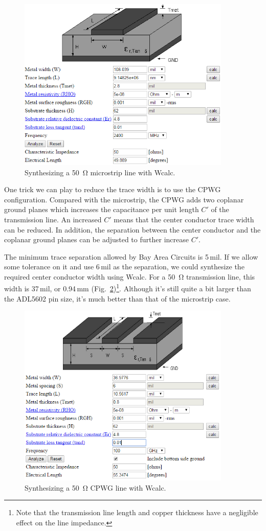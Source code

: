 \documentclass[12pt,letterpaper]{scrartcl}
\begin{document}
	\begin{figure}[h]
		\centering
		\includegraphics[width=4in]{ustrip-synth}
		\caption{Synthesizing a \SI{50}{\ohm} microstrip line with Wcalc.}
		\label{fig:ustrip-synth}
	\end{figure}

One trick we can play to reduce the trace width is to use the CPWG configuration. Compared with the microstrip, the CPWG adds two coplanar ground planes which increases the capacitance per unit length $C'$ of the transmission line. An increased $C'$ means that the center conductor trace width can be reduced. In addition, the separation between the center conductor and the coplanar ground planes can be adjusted to further increase $C'$.  

The minimum trace separation allowed by Bay Area Circuits is 5\,mil. If we allow some tolerance on it and use 6\,mil as the separation, we could synthesize the required center conductor width using Wcalc. For a \SI{50}{\ohm} transmission line, this width is 37\,mil, or 0.94\,mm (Fig.~\ref{fig:cpwg-synth})\footnote{Note that the transmission line length and copper thickness have a negligible effect on the line impedance.}. Although it's still quite a bit larger than the ADL5602 pin size, it's much better than that of the microstrip case. 

	\begin{figure}[hp]
		\centering
		\includegraphics[width=4in]{cpwg-synth}
		\caption{Synthesizing a \SI{50}{\ohm} CPWG line with Wcalc.}
		\label{fig:cpwg-synth}
	\end{figure}
\end{document}
